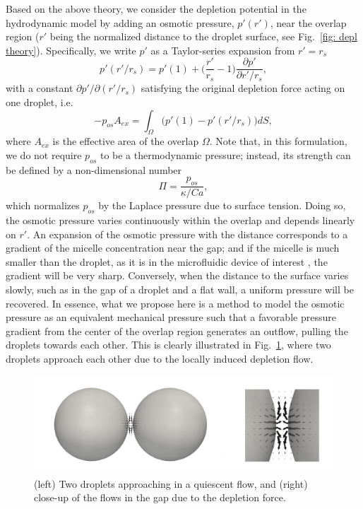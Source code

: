 Based on the above theory, we consider the depletion potential in the hydrodynamic model by adding an osmotic pressure, $p'(r')$, near the overlap region ($r'$ being the normalized distance to the droplet surface, see Fig.\ \ref{fig: depl theory}). Specifically, we write $p'$ as a Taylor-series expansion from $r'=r_s$
\begin{equation}
    p'(r'/r_s) = p'(1) + \bigg(\frac{r'}{r_s}-1 \bigg) \frac{\partial{p'}}{\partial{r'/r_s}},
    \label{pot P linear}
\end{equation}
with a constant $\partial{p'}/\partial{(r'/r_s)}$ satisfying the original depletion force acting on one droplet, i.e.
\begin{equation}
    -p_{os}A_{ex} = \int_\Omega \big(p'(1) - p'(r'/r_s)\big)dS,
    \label{pot P balance}
\end{equation}
where $A_{ex}$ is the effective area of the overlap $\Omega$. Note that, in this formulation, we do not require $p_{os}$ to be a thermodynamic pressure; instead, its strength can be defined by a non-dimensional number
\begin{equation}
    \Pi = \frac{p_{os}}{\kappa /Ca},
    \label{Pi}
\end{equation}
which normalizes $p_{os}$ by the Laplace pressure due to surface tension. Doing so, the osmotic pressure varies continuously within the overlap and depends linearly on $r'$. An expansion of the osmotic pressure with the distance corresponds to a gradient of the micelle concentration near the gap; and if the micelle is much smaller than the droplet, as it is in the microfluidic device of interest \cite{Shen_2016AS}, the gradient will be very sharp. Conversely, when the distance to the surface varies slowly, such as in the gap of a  droplet and a flat wall, a uniform pressure will be recovered. In essence, what we propose here is a method to model the osmotic pressure as an equivalent mechanical pressure such that a favorable pressure gradient from the center of the overlap region generates an outflow, pulling the droplets towards each other. This is clearly illustrated in Fig.\ \ref{fig: depl flow}, where two droplets approach each other due to the locally induced depletion flow.

\begin{figure}[t]
 \centering
 \includegraphics[width=0.9\columnwidth]{figs/depletion_flow.png}
 \caption{(left) Two droplets approaching in a quiescent flow, and (right) close-up of the flows in the gap due to the depletion force.}
 \label{fig: depl flow}
\end{figure}

